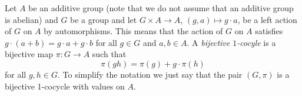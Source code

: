 %
%
%
%
%
%

Let $A$ be an additive group (note that we do not assume that an additive group is abelian) 
and $G$ be a group and let 
$G\times A\to A$, $(g,a)\mapsto g\cdot a$,
be a left action of $G$ on $A$ by automorphisms. This means that the action of $G$ on $A$ satisfies 
$g\cdot (a+b)=g\cdot a+g\cdot b$ for all $g\in G$ and $a,b\in A$.
A \emph{bijective
$1$-cocyle} is a bijective map $\pi\colon G\to A$ such that 
\begin{equation}
    \label{eq:1cocycle}
    \pi(gh)=\pi(g)+g\cdot \pi(h)
\end{equation}
for all $g,h\in G$. To simplify the notation we 
just say that the pair $(G,\pi)$ is a bijective 1-cocycle with values
on $A$. 

